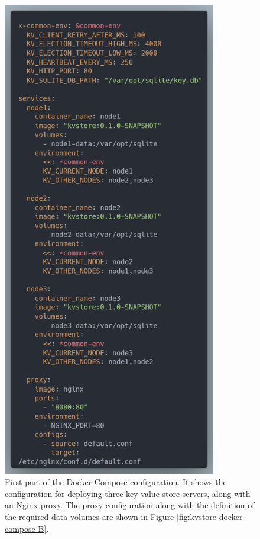\begin{figure}[ht]
  \centering
  \includegraphics[width=265pt]{images/kvstore-docker-compose-A.png}
  \caption{First part of the Docker Compose configuration. It shows the configuration for deploying three key-value store servers, along with an Nginx proxy. The proxy configuration along with the definition of the required data volumes are shown in Figure \ref{fig:kvstore-docker-compose-B}.}
  \label{fig:kvstore-docker-compose-A}
\end{figure}


